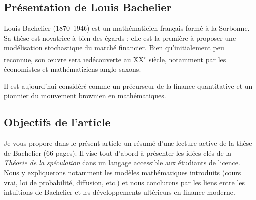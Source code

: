 \documentclass[12pt,a4paper]{article}
\begin{document}
\subsection{Présentation de Louis Bachelier}

Louis Bachelier (1870–1946) est un mathématicien français formé à la Sorbonne. Sa thèse est novatrice à bien des égards : elle est la première à proposer une modélisation stochastique du marché financier. Bien qu’initialement peu reconnue, son œuvre sera redécouverte au XX\textsuperscript{e} siècle, notamment par les économistes et mathématiciens anglo-saxons.

Il est aujourd’hui considéré comme un précurseur de la finance quantitative et un pionnier du mouvement brownien en mathématiques.

\subsection{Objectifs de l'article}

Je vous propore dans le présent article un résumé d'une lecture active de la thèse de Bachelier (66 pages). Il vise tout d'abord à présenter les idées clés de la \textit{Théorie de la spéculation} dans un langage accessible aux étudiants de licence. Nous y expliquerons notamment les modèles mathématiques introduits (cours vrai, loi de probabilité, diffusion, etc.) et nous conclurons par les liens entre les intuitions de Bachelier et les développements ultérieurs en finance moderne.



\end{document}
